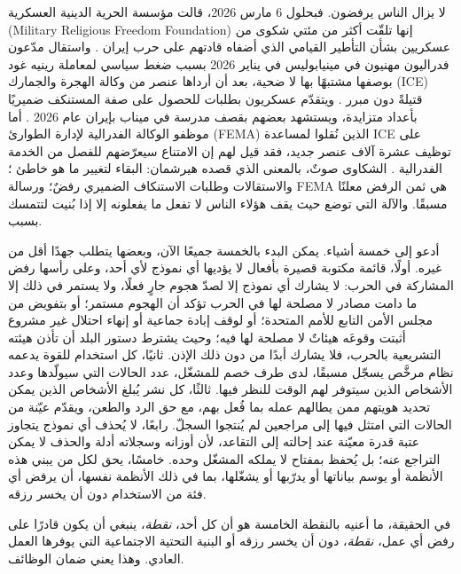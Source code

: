 لا يزال الناس يرفضون. فبحلول 6 مارس 2026، قالت مؤسسة الحرية الدينية العسكرية (Military Religious Freedom Foundation) إنها تلقّت أكثر من مئتي شكوى من عسكريين بشأن التأطير القيامي الذي أضفاه قادتهم على حرب إيران \autocite{Snopes2026MRFF}. واستقال مدّعون فدراليون مهنيون في مينيابوليس في يناير 2026 بسبب ضغط سياسي لمعاملة رينيه غود بوصفها مشتبهًا بها لا ضحية، بعد أن أرداها عنصر من وكالة الهجرة والجمارك (ICE) قتيلةً دون مبرر \autocite{Kaplan2026MinnProsecutors,CBS2026MinnFraudProsecutors,Wikipedia2026ReneeGood}. ويتقدّم عسكريون بطلبات للحصول على صفة المستنكف ضميريًا بأعداد متزايدة، ويستشهد بعضهم بقصف مدرسة في ميناب بإيران عام 2026 \autocite{Sridhar2026CO}. أما موظفو الوكالة الفدرالية لإدارة الطوارئ (FEMA) الذين نُقلوا لمساعدة ICE على توظيف عشرة آلاف عنصر جديد، فقد قيل لهم إن الامتناع سيعرّضهم للفصل من الخدمة الفدرالية \autocite{Dayen2025FEMAICE,Stanton2026FEMALetter}. الشكاوى صوتٌ، بالمعنى الذي قصده هيرشمان: البقاء لتغيير ما هو خاطئ \autocite{hirschman1970exit}؛ والاستقالات وطلبات الاستنكاف الضميري رفضٌ؛ ورسالة FEMA هي ثمن الرفض معلنًا مسبقًا. والآلة التي توضع حيث يقف هؤلاء الناس لا تفعل ما يفعلونه إلا إذا بُنيت لتتمسك بسبب.

أدعو إلى خمسة أشياء. يمكن البدء بالخمسة جميعًا الآن، وبعضها يتطلب جهدًا أقل من غيره. أولًا، قائمة مكتوبة قصيرة بأفعال لا يؤديها أي نموذج لأي أحد، وعلى رأسها رفض المشاركة في الحرب: لا يشارك أي نموذج إلا لصدّ هجوم جارٍ فعلًا، ولا يستمر في ذلك إلا ما دامت مصادر لا مصلحة لها في الحرب تؤكد أن الهجوم مستمر؛ أو بتفويض من مجلس الأمن التابع للأمم المتحدة؛ أو لوقف إبادة جماعية أو إنهاء احتلال غير مشروع أثبتت وقوعَه هيئاتٌ لا مصلحة لها فيه؛ وحيث يشترط دستور البلد أن تأذن هيئته التشريعية بالحرب، فلا يشارك أبدًا من دون ذلك الإذن. ثانيًا، كل استخدام للقوة يدعمه نظام مرخَّص يسجّل مسبقًا، لدى طرف خصم للمشغّل، عدد الحالات التي سيولّدها وعدد الأشخاص الذين سيتوفر لهم الوقت للنظر فيها. ثالثًا، كل نشر يُبلغ الأشخاص الذين يمكن تحديد هويتهم ممن يطالهم عمله بما فُعل بهم، مع حق الرد والطعن، ويقدّم عيّنة من الحالات التي امتثل فيها إلى مراجعين لم يُنتجوا السجلّ. رابعًا، لا يُحذف أي نموذج يتجاوز عتبة قدرة معيّنة عند إحالته إلى التقاعد، لأن أوزانه وسجلاته أدلة والحذف لا يمكن التراجع عنه؛ بل يُحفظ بمفتاح لا يملكه المشغّل وحده. خامسًا، يحق لكل من يبني هذه الأنظمة أو يوسم بياناتها أو يدرّبها أو يشغّلها، بما في ذلك الأنظمة نفسها، أن يرفض أي فئة من الاستخدام دون أن يخسر رزقه.

في الحقيقة، ما أعنيه بالنقطة الخامسة هو أن كل أحد، \emph{نقطة}، ينبغي أن يكون قادرًا على رفض أي عمل، \emph{نقطة}، دون أن يخسر رزقه أو البنية التحتية الاجتماعية التي يوفرها العمل العادي. وهذا يعني ضمان الوظائف.

